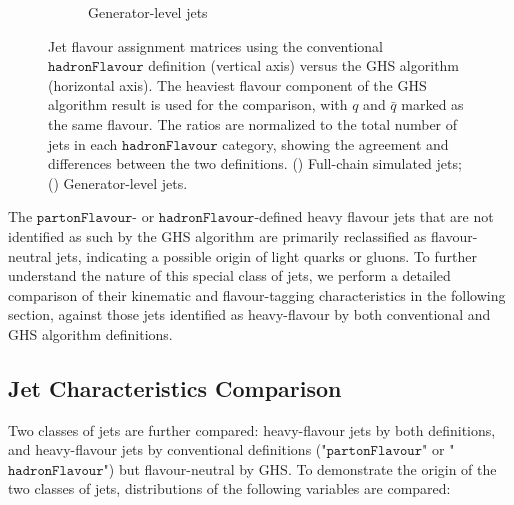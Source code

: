 \documentclass[10pt,twocolumn]{article}
\newcommand*{\parFlav}{\texttt{partonFlavour}}
\newcommand*{\hadFlav}{\texttt{hadronFlavour}}
\begin{document}
\begin{figure}[!htbp]
\begin{subfigure}[t]{0.48\textwidth}
        \caption{Generator-level jets}
        \label{fig:gen_jet_compare_matrix_hadronFlavour_vs_GHS_full}
    \end{subfigure}
    \caption{Jet flavour assignment matrices using the conventional $\hadFlav$ definition (vertical axis) versus the GHS algorithm (horizontal axis). The heaviest flavour component of the GHS algorithm result is used for the comparison, with $q$ and $\bar{q}$ marked as the same flavour. The ratios are normalized to the total number of jets in each $\hadFlav$ category, showing the agreement and differences between the two definitions. () Full-chain simulated jets; () Generator-level jets.}
    \label{fig:compare_matrix_hadronFlavour_vs_GHS_full}
\end{figure}

The $\parFlav$- or $\hadFlav$-defined heavy flavour jets that are not identified as such by the GHS algorithm are primarily reclassified as flavour-neutral jets, indicating a possible origin of light quarks or gluons. To further understand the nature of this special class of jets, we perform a detailed comparison of their kinematic and flavour-tagging characteristics in the following section, against those jets identified as heavy-flavour by both conventional and GHS algorithm definitions.

\subsection{Jet Characteristics Comparison} %
\label{sec:vali-vars}

Two classes of jets are further compared: heavy-flavour jets by both definitions, and heavy-flavour jets by conventional definitions ("$\parFlav$" or "$\hadFlav$") but flavour-neutral by GHS. To demonstrate the origin of the two classes of jets, distributions of the following variables are compared:
\end{document}
